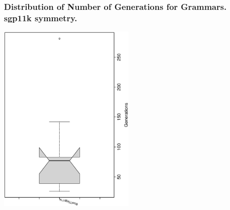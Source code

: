  \begin{frame}
 \frametitle{ Distribution of Number of Generations for Grammars. sgp11k  symmetry. }
 \begin{center}
\includegraphics[width=0.5\textwidth, angle=-90]
{ExpFboxplottGenerations009.eps}
 \end{center}
 \label{ExpFboxplottGenerations009.eps}  
 \end{frame}

